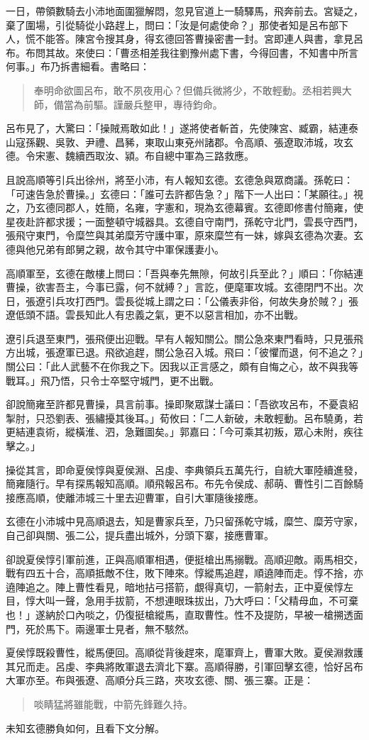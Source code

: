一日，帶領數騎去小沛地面圍獵解悶，忽見官道上一騎驛馬，飛奔前去。宮疑之，棄了圍場，引從騎從小路趕上，問曰：「汝是何處使命？」那使者知是呂布部下人，慌不能答。陳宮令搜其身，得玄德回答曹操密書一封。宮即連人與書，拿見呂布。布問其故。來使曰：「曹丞相差我往劉豫州處下書，今得回書，不知書中所言何事。」布乃拆書細看。書略曰：

\begin{quote}
奉明命欲圖呂布，敢不夙夜用心？但備兵微將少，不敢輕動。丞相若興大師，備當為前驅。謹嚴兵整甲，專待鈞命。
\end{quote}

呂布見了，大驚曰：「操賊焉敢如此！」遂將使者斬首，先使陳宮、臧霸，結連泰山寇孫觀、吳敦、尹禮、昌豨，東取山東兗州諸郡。令高順、張遼取沛城，攻玄德。令宋憲、魏續西取汝、潁。布自總中軍為三路救應。

且說高順等引兵出徐州，將至小沛，有人報知玄德。玄德急與眾商議。孫乾曰：「可速告急於曹操。」玄德曰：「誰可去許都告急？」階下一人出曰：「某願往。」視之，乃玄德同郡人，姓簡，名雍，字憲和，現為玄德幕賓。玄德即修書付簡雍，使星夜赴許都求援；一面整頓守城器具。玄德自守南門，孫乾守北門，雲長守西門，張飛守東門，令糜竺與其弟糜芳守護中軍，原來糜竺有一妹，嫁與玄德為次妻。玄德與他兄弟有郎舅之親，故令其守中軍保護妻小。

高順軍至，玄德在敵樓上問曰：「吾與奉先無隙，何故引兵至此？」順曰：「你結連曹操，欲害吾主，今事已露，何不就縛？」言訖，便麾軍攻城。玄德閉門不出。次日，張遼引兵攻打西門。雲長從城上謂之曰：「公儀表非俗，何故失身於賊？」張遼低頭不語。雲長知此人有忠義之氣，更不以惡言相加，亦不出戰。

遼引兵退至東門，張飛便出迎戰。早有人報知關公。關公急來東門看時，只見張飛方出城，張遼軍已退。飛欲追趕，關公急召入城。飛曰：「彼懼而退，何不追之？」關公曰：「此人武藝不在你我之下。因我以正言感之，頗有自悔之心，故不與我等戰耳。」飛乃悟，只令士卒堅守城門，更不出戰。

卻說簡雍至許都見曹操，具言前事。操即聚眾謀士議曰：「吾欲攻呂布，不憂袁紹掣肘，只恐劉表、張繡擾其後耳。」荀攸曰：「二人新破，未敢輕動。呂布驍勇，若更結連袁術，縱橫淮、泗，急難圖矣。」郭嘉曰：「今可乘其初叛，眾心未附，疾往擊之。」

操從其言，即命夏侯惇與夏侯淵、呂虔、李典領兵五萬先行，自統大軍陸續進發，簡雍隨行。早有探馬報知高順。順飛報呂布。布先令侯成、郝萌、曹性引二百餘騎接應高順，使離沛城三十里去迎曹軍，自引大軍隨後接應。

玄德在小沛城中見高順退去，知是曹家兵至，乃只留孫乾守城，糜竺、糜芳守家，自己卻與關、張二公，提兵盡出城外，分頭下寨，接應曹軍。

卻說夏侯惇引軍前進，正與高順軍相遇，便挺槍出馬搦戰。高順迎敵。兩馬相交，戰有四五十合，高順抵敵不住，敗下陣來。惇縱馬追趕，順遶陣而走。惇不捨，亦遶陣追之。陣上曹性看見，暗地拈弓搭箭，覷得真切，一箭射去，正中夏侯惇左目，惇大叫一聲，急用手拔箭，不想連眼珠拔出，乃大呼曰：「父精母血，不可棄也！」遂納於口內啖之，仍復挺槍縱馬，直取曹性。性不及提防，早被一槍搠透面門，死於馬下。兩邊軍士見者，無不駭然。

夏侯惇既殺曹性，縱馬便回。高順從背後趕來，麾軍齊上，曹軍大敗。夏侯淵救護其兄而走。呂虔、李典將敗軍退去濟北下寨。高順得勝，引軍回擊玄德，恰好呂布大軍亦至。布與張遼、高順分兵三路，夾攻玄德、關、張三寨。正是：

\begin{quote}
啖睛猛將雖能戰，中箭先鋒難久持。
\end{quote}

未知玄德勝負如何，且看下文分解。
